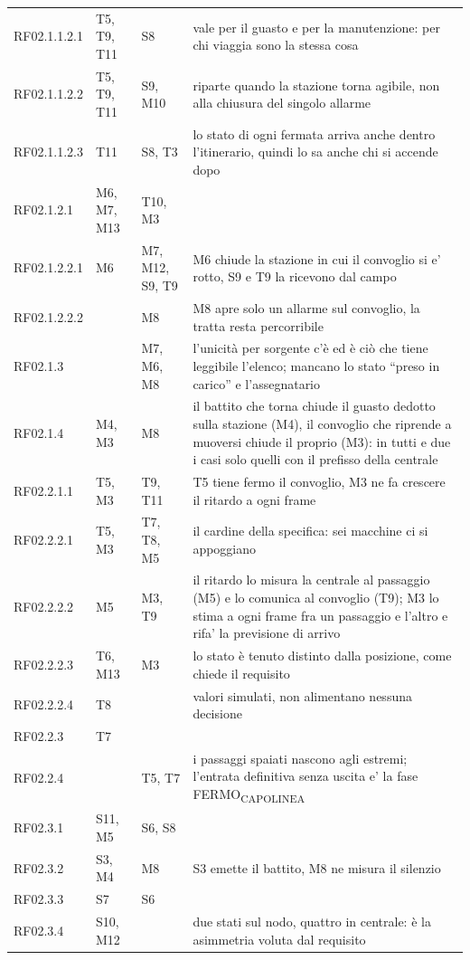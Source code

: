 \documentclass[11pt]{article}
\begin{document}
{\begin{longtable}{L{0.13\textwidth}L{0.13\textwidth}L{0.13\textwidth}L{0.48\textwidth}}
RF02.1.1.2.1 & T5, T9, T11 & S8 & vale per il guasto e per la manutenzione: per chi viaggia sono la stessa cosa\\
RF02.1.1.2.2 & T5, T9, T11 & S9, M10 & riparte quando la stazione torna agibile, non alla chiusura del singolo allarme\\
RF02.1.1.2.3 & T11 & S8, T3 & lo stato di ogni fermata arriva anche dentro l'itinerario, quindi lo sa anche chi si accende dopo\\
RF02.1.2.1 & M6, M7, M13 & T10, M3 & \\
RF02.1.2.2.1 & M6 & M7, M12, S9, T9 & M6 chiude la stazione in cui il convoglio si e' rotto, S9 e T9 la ricevono dal campo\\
RF02.1.2.2.2 &  & M8 & M8 apre solo un allarme sul convoglio, la tratta resta percorribile\\
RF02.1.3 &  & M7, M6, M8 & l'unicità per sorgente c'è ed è ciò che tiene leggibile l'elenco; mancano lo stato ``preso in carico'' e l'assegnatario\\
RF02.1.4 & M4, M3 & M8 & il battito che torna chiude il guasto dedotto sulla stazione (M4), il convoglio che riprende a muoversi chiude il proprio (M3): in tutti e due i casi solo quelli con il prefisso della centrale\\
RF02.2.1.1 & T5, M3 & T9, T11 & T5 tiene fermo il convoglio, M3 ne fa crescere il ritardo a ogni frame\\
RF02.2.2.1 & T5, M3 & T7, T8, M5 & il cardine della specifica: sei macchine ci si appoggiano\\
RF02.2.2.2 & M5 & M3, T9 & il ritardo lo misura la centrale al passaggio (M5) e lo comunica al convoglio (T9); M3 lo stima a ogni frame fra un passaggio e l'altro e rifa' la previsione di arrivo\\
RF02.2.2.3 & T6, M13 & M3 & lo stato è tenuto distinto dalla posizione, come chiede il requisito\\
RF02.2.2.4 & T8 &  & valori simulati, non alimentano nessuna decisione\\
RF02.2.3 & T7 &  & \\
RF02.2.4 &  & T5, T7 & i passaggi spaiati nascono agli estremi; l'entrata definitiva senza uscita e' la fase FERMO\textsubscript{CAPOLINEA}\\
RF02.3.1 & S11, M5 & S6, S8 & \\
RF02.3.2 & S3, M4 & M8 & S3 emette il battito, M8 ne misura il silenzio\\
RF02.3.3 & S7 & S6 & \\
RF02.3.4 & S10, M12 &  & due stati sul nodo, quattro in centrale: è la asimmetria voluta dal requisito\\

\end{longtable}}
\end{document}
